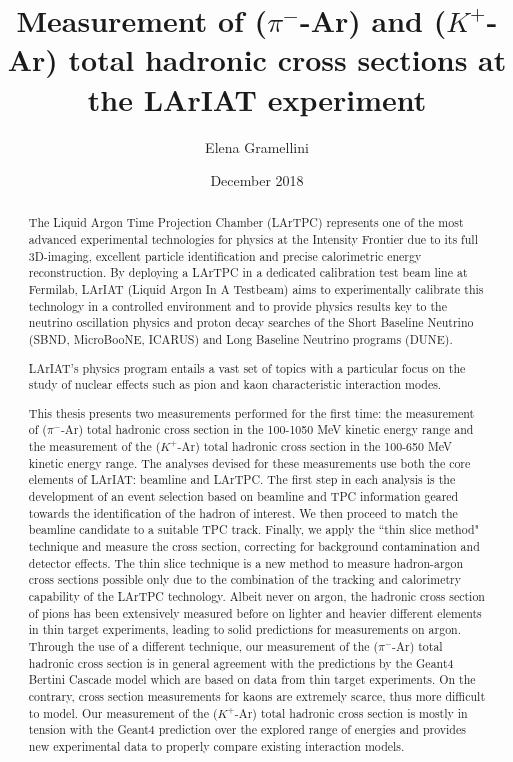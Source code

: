 \documentclass[letterpaper,12pt]{yalephd}
\begin{document}
\title{Measurement of ($\pi^-$-Ar) and ($K^+$-Ar) total hadronic cross sections at the LArIAT experiment}
\author{Elena Gramellini}
\date{December 2018} %

\frontmatter

\begin{abstract}

The Liquid Argon Time Projection Chamber (LArTPC) represents one of the
most advanced experimental technologies for physics at the Intensity
Frontier due to its full 3D-imaging, excellent particle identification
and precise calorimetric energy reconstruction. By deploying a LArTPC in
a dedicated calibration test beam line at Fermilab, LArIAT (Liquid
Argon In A Testbeam) aims to experimentally calibrate this technology
in a controlled environment and to provide physics results key to the
neutrino oscillation physics and proton decay searches of the Short
Baseline Neutrino (SBND, MicroBooNE, ICARUS) and Long Baseline Neutrino programs (DUNE).

LArIAT's physics program entails a vast set of topics with a
particular focus on the study of nuclear effects such as pion and
kaon characteristic interaction modes. 

This thesis presents two measurements performed for the first time: the measurement of ($\pi^-$-Ar) total hadronic cross section in the 100-1050 MeV kinetic energy range and the measurement of the ($K^+$-Ar) total hadronic cross section in the 100-650 MeV kinetic energy range. The analyses devised for these measurements use both the core elements of LArIAT: beamline and LArTPC. The first step in each analysis is the development of an event selection based on  beamline and TPC information geared towards the identification of the hadron of interest. We then proceed to match the beamline candidate to a suitable TPC track. Finally,  we apply the ``thin slice method" technique and measure the cross section, correcting for background contamination and detector effects. The thin slice technique is a new method to measure hadron-argon cross sections possible only due to the combination of the tracking and calorimetry capability of the LArTPC technology. 
Albeit never on argon, the hadronic cross section of pions has been extensively measured before on lighter and heavier different elements in thin target experiments, leading to solid predictions for measurements on argon. Through the use of a different technique, our measurement of the  ($\pi^-$-Ar) total hadronic cross section is in general agreement with the predictions by the Geant4 Bertini Cascade model which are based on data from thin target experiments. On the contrary, cross section measurements for kaons are extremely scarce, thus more difficult to model. Our measurement of the  ($K^+$-Ar) total hadronic cross section is mostly in tension with the Geant4 prediction over the explored range of energies and provides new experimental data to properly compare existing interaction models.


\end{abstract}
\end{document}
